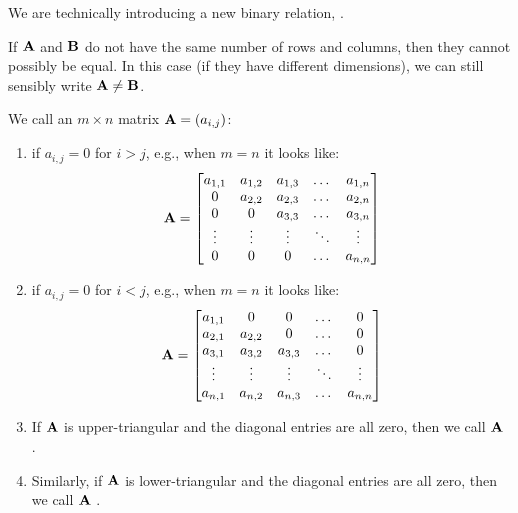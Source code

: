 \begin{remark}
We are technically introducing a new binary relation, .
\end{remark}

\begin{remark}
If $\mathbf{A}$ and $\mathbf{B}$ do not have the same number of rows and columns, then
they cannot possibly be equal. In this case (if they have different
dimensions), we can still sensibly write $\mathbf{A}\neq\mathbf{B}$.
\end{remark}

\begin{definition}
We call an $m\times n$ matrix $\mathbf{A}=(a_{i,j})$:
\begin{enumerate}
\item {} if $a_{i,j}=0$ for $i>j$, e.g., when
  $m=n$ it looks like:
  \[ \mathbf{A} = \begin{bmatrix}
    a_{1,1} & a_{1,2} & a_{1,3} & \dots & a_{1,n}\\
    0      & a_{2,2} & a_{2,3} & \dots & a_{2,n}\\
    0      & 0       & a_{3,3} & \dots & a_{3,n}\\
    \vdots & \vdots & \vdots & \ddots & \vdots\\
    0      & 0      & 0      & \dots  & a_{n,n}
  \end{bmatrix} \]
\item {} if $a_{i,j}=0$ for $i<j$, e.g., when
  $m=n$ it looks like:
  \[ \mathbf{A} = \begin{bmatrix}
    a_{1,1} & 0      & 0       & \dots & 0\\
    a_{2,1} & a_{2,2} & 0       & \dots & 0\\
    a_{3,1} & a_{3,2} & a_{3,3} & \dots & 0\\
    \vdots & \vdots & \vdots & \ddots & \vdots\\
    a_{n,1} & a_{n,2} & a_{n,3} & \dots  & a_{n,n}
  \end{bmatrix} \]
\item If $\mathbf{A}$ is upper-triangular and the diagonal entries are all zero,
  then we call $\mathbf{A}$ .
\item Similarly, if $\mathbf{A}$ is lower-triangular and the diagonal entries are
  all zero, then we call $\mathbf{A}$ .
\end{enumerate}
\end{definition}

